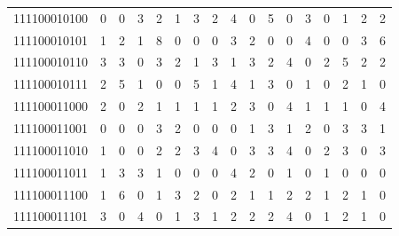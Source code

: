 \documentclass[10pt,a4paper]{article}
\begin{document}
\begin{longtable}{ |c|c|c|c|c|c|c|c|c|c|c|c|c|c|c|c|c| }
    111100010100              & 0                            & 0                                & 3                            & 2                              & 1   & 3   & 2   & 4   & 0   & 5   & 0   & 3   & 0   & 1   & 2   & 2   \\
    111100010101              & 1                            & 2                                & 1                            & 8                              & 0   & 0   & 0   & 3   & 2   & 0   & 0   & 4   & 0   & 0   & 3   & 6   \\
    111100010110              & 3                            & 3                                & 0                            & 3                              & 2   & 1   & 3   & 1   & 3   & 2   & 4   & 0   & 2   & 5   & 2   & 2   \\
    111100010111              & 2                            & 5                                & 1                            & 0                              & 0   & 5   & 1   & 4   & 1   & 3   & 0   & 1   & 0   & 2   & 1   & 0   \\
    111100011000              & 2                            & 0                                & 2                            & 1                              & 1   & 1   & 1   & 2   & 3   & 0   & 4   & 1   & 1   & 1   & 0   & 4   \\
    111100011001              & 0                            & 0                                & 0                            & 3                              & 2   & 0   & 0   & 0   & 1   & 3   & 1   & 2   & 0   & 3   & 3   & 1   \\
    111100011010              & 1                            & 0                                & 0                            & 2                              & 2   & 3   & 4   & 0   & 3   & 3   & 4   & 0   & 2   & 3   & 0   & 3   \\
    111100011011              & 1                            & 3                                & 3                            & 1                              & 0   & 0   & 0   & 4   & 2   & 0   & 1   & 0   & 1   & 0   & 0   & 0   \\
    111100011100              & 1                            & 6                                & 0                            & 1                              & 3   & 2   & 0   & 2   & 1   & 1   & 2   & 2   & 1   & 2   & 1   & 0   \\
    111100011101              & 3                            & 0                                & 4                            & 0                              & 1   & 3   & 1   & 2   & 2   & 2   & 4   & 0   & 1   & 2   & 1   & 0   \\

\end{longtable}
\end{document}
